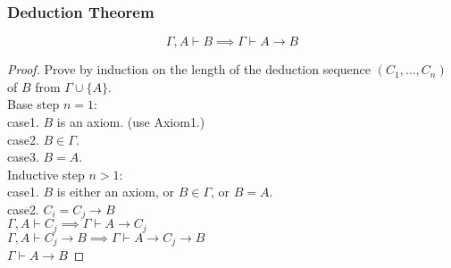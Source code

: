\documentclass[UTF8,11pt,colorlinks,compress,openany]{beamer}%
\begin{document}
\begin{frame}\frametitle{Deduction Theorem}
	\begin{theorem}
		\[\Gamma, A\vdash B\implies\Gamma\vdash A\to B\]
	\end{theorem}
	\begin{proof}Prove by induction on the length of the deduction sequence $(C_1,\dots,C_n)$ of $B$ from $\Gamma\cup\{A\}$.\\
		Base step $n=1$:\\
		case1. $B$ is an axiom. (use Axiom1.)\\
		case2. $B\in\Gamma$.\\
		case3. $B=A$.\\
		Inductive step $n>1$:\\
		case1. $B$ is either an axiom, or $B\in\Gamma$, or $B=A$.\\
		case2. $C_i=C_j\to B$\\
		$\Gamma, A\vdash C_j\implies\Gamma\vdash A\to C_j$\\
		$\Gamma, A\vdash C_j\to B\implies\Gamma\vdash A\to C_j\to B$\\
		$\Gamma\vdash A\to B$
	\end{proof}
\end{frame}
\end{document}
